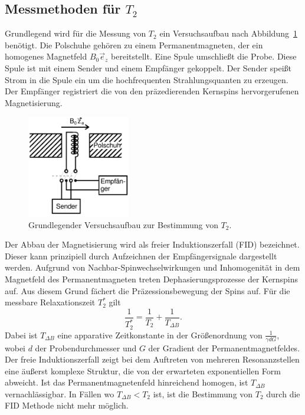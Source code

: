 \subsection{Messmethoden für $T_2$}

Grundlegend wird für die Messung von $T_2$ ein Versuchsaufbau nach
Abbildung~\ref{fig:aufbau} benötigt. Die Polschuhe gehören zu einem
Permanentmagneten, der ein homogenes Magnetfeld $B_0\vec{e}_z$
bereitstellt. Eine Spule umschließt die Probe.
Diese Spule ist mit einem Sender und einem Empfänger gekoppelt.
Der Sender speißt Strom in die Spule ein um die
hochfrequenten Strahlungsquanten zu erzeugen.
Der Empfänger registriert die von den präzedierenden Kernspins
hervorgerufenen Magnetisierung.
\begin{figure}
  \centering
  \includegraphics[width = 0.4\textwidth]{Pics/aufbau.pdf}
  \caption{Grundlegender Versuchsaufbau zur Bestimmung von $T_2$\cite{anleitung}.}
  \label{fig:aufbau}
\end{figure}
Der Abbau der Magnetisierung wird als freier Induktionszerfall (FID)
bezeichnet. Dieser kann prinzipiell durch Aufzeichnen der
Empfängersignale dargestellt werden.
Aufgrund von Nachbar-Spinwechselwirkungen und Inhomogenität in dem Magnetfeld des
Permanentmagneten treten Dephasierungsprozesse der Kernspins auf.
Aus diesem Grund fächert die Präzessionsbewegung der Spins
auf. Für die messbare Relaxationszeit $T^*_2$ gilt
\begin{equation}
  \label{eqn:T^*}
  \frac{1}{T^*_2} = \frac{1}{T_2} + \frac{1}{T_{\Delta B}}.
\end{equation}
Dabei ist $T_{\Delta B}$ eine apparative Zeitkonstante in der
Größenordnung von $\frac{1}{\gamma d G}$, wobei $d$ der Probendurchmesser
und $G$ der Gradient der Permanentmagnetfeldes.
Der freie Induktionszerfall zeigt bei dem Auftreten von mehreren
Resonanzstellen eine äußerst komplexe Struktur, die von der erwarteten
exponentiellen Form abweicht.
Ist das Permanentmagnetenfeld hinreichend homogen, ist
$T_{\Delta B}$ vernachlässigbar. In Fällen wo $T_{\Delta B} < T_2$
ist, ist die Bestimmung von $T_2$ durch die FID Methode nicht mehr möglich.


